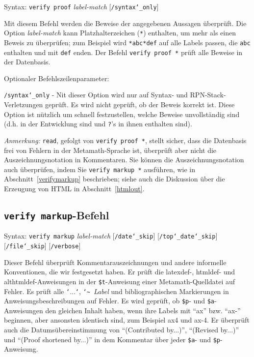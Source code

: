 Syntax:  \texttt{verify proof} {\em label-match} [\texttt{/syntax{\char`\_}only}]

Mit diesem Befehl werden die Beweise der angegebenen Aussagen überprüft.  Die Option {\em label-match} kann Platzhalterzeichen (\texttt{*}) enthalten, um mehr als einen Beweis zu überprüfen; zum Beispiel wird \verb/*abc*def/ auf alle Labels passen, die \texttt{abc} enthalten und mit \texttt{def} enden. Der Befehl \texttt{verify proof *} prüft alle Beweise in der Datenbasis. 

Optionaler Befehlszeilenparameter:

    \texttt{/syntax{\char`\_}only} - Nit dieser Option wird nur auf Syntax- und RPN-Stack-Verletzungen geprüft.  Es wird nicht geprüft, ob der Beweis korrekt ist.  Diese Option ist nützlich um schnell festzustellen, welche Beweise unvollständig sind (d.h. in der Entwicklung sind und \texttt{?}'s in ihnen enthalten sind).

{\em Anmerkung:} \texttt{read}, gefolgt von \texttt{verify proof *}, stellt sicher, dass die Datenbasis frei von Fehlern in der Metamath-Sprache ist, überprüft aber nicht die Auszeichnungsnotation in Kommentaren. Sie können die Auszeichnungsnotation auch überprüfen, indem Sie \texttt{verify markup *} ausführen, wie in Abschnitt~\ref{verifymarkup} beschrieben; siehe auch die Diskussion über die Erzeugung von {\sc HTML} in Abschnitt~\ref{htmlout}. 


\subsection{\texttt{verify markup}-Befehl}\label{verifymarkup}

Syntax:  \texttt{verify markup} {\em label-match}
[\texttt{/date{\char`\_}skip}]
[\texttt{/top{\char`\_}date{\char`\_}skip}] {\\}
[\texttt{/file{\char`\_}skip}]
[\texttt{/verbose}]

Dieser Befehl überprüft Kommentarauszeichnungen und andere informelle Konventionen, die wir festgesetzt haben.  Er prüft die latexdef-, htmldef- und althtmldef-Anweisungen in der \texttt{\$t}-Anweisung einer Metamath-Quelldatei auf Fehler. Es prüft alle \texttt{`}...\texttt{`}, \texttt{\char`\~}~\textit{Label} und bibliographischen Markierungen in Anweisungsbeschreibungen auf Fehler. Es wird geprüft, ob \texttt{\$p}- und \texttt{\$a}-Anweisungen den gleichen Inhalt haben, wenn ihre Labels mit "`ax"' bzw. "`ax-"' beginnen, aber ansonsten identisch sind, zum Beispiel ax4 und ax-4. Er überprüft auch die Datumsübereinstimmung von "`(Contributed by...)"', "`(Revised by...)"' und "`(Proof shortened by...)"' in dem Kommentar über jeder \texttt{\$a}- und \texttt{\$p}-Anweisung. 

